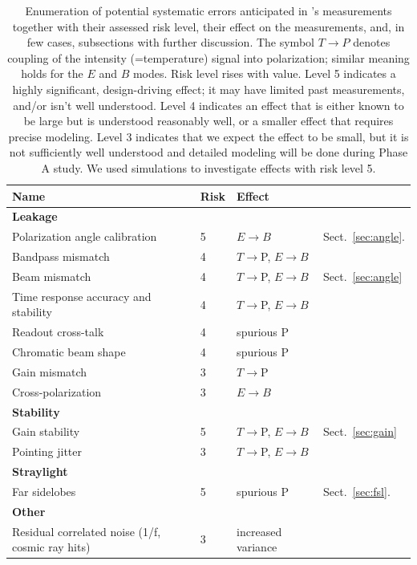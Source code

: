 \documentclass[PICOReport.tex]{subfiles}
\begin{document}
\begin{table}[h!]
\hspace{-0.1in}
\parbox{3.5in}{
\centering
\scriptsize
 \begin{tabular}{p{3.3cm} p{0.5cm} p{1.4cm} p{1.7cm}}
 \hline
\textbf{Name} & \textbf{Risk}&\textbf{Effect} \\
 \hline
\textbf{Leakage}& &\\
Polarization angle calibration\dotfill& 
5&
$E{\to}B$ &
Sect.~\ref{sec:angle}.
\\
 Bandpass mismatch\dotfill&
 4& 
$T{\to}$P, $E{\to}B$  
   \\
Beam mismatch\dotfill& 
4&
$T{\to}$P, $E{\to}B$
& Sect.~\ref{sec:angle}
\\
Time response accuracy and stability\dotfill&
4&
$T{\to}$P, $E{\to}B$
\\
Readout cross-talk\dotfill& 
4&
spurious P
\\
Chromatic beam shape\dotfill&
4&
spurious P
\\

Gain mismatch\dotfill&
3&
$T{\to}$P   
\\


Cross-polarization\dotfill&
3&
$E{\to}B$
\\
\hline 
\textbf{Stability} & & \\
Gain stability\dotfill& 
5&
$T{\to}$P, $E{\to} B$
& 
Sect.~\ref{sec:gain}
\\
Pointing jitter\dotfill&
3&
$T{\to}$P, $E{\to}B$
\\

\hline
\textbf{Straylight}& & \\
Far sidelobes\dotfill& 
5&
spurious P
&
Sect.~\ref{sec:fsl}.\\
 \hline
\textbf{Other} \\
Residual correlated noise (1/f, cosmic ray hits)\dotfill&
3 &
increased variance
\\
\hline
 \end{tabular}
}
\hspace{-0.0in}
\parbox{3.1in}{
\caption{\captiontext
Enumeration of potential systematic errors anticipated in \pico's measurements together with their assessed risk level, 
their effect on the measurements, and, in few cases, subsections with further discussion. The symbol $T \rightarrow P$ denotes coupling of the intensity (=temperature) signal into polarization; similar meaning holds for the $E$ and $B$ modes.  Risk level rises with value. Level 5 indicates a highly significant, design-driving effect; it may have limited past measurements, and/or isn't well understood.  Level 4 indicates an effect that is either known to be large but is understood reasonably well, or a smaller effect that requires precise modeling.  Level 3 indicates that we expect the effect to be small, but it is not sufficiently well understood and detailed modeling will be done during Phase A study. We used simulations to investigate effects with risk level 5.
\label{tbl:SystematicsList2col} }}
\hspace{-0.0in}
\end{table}
\end{document}
